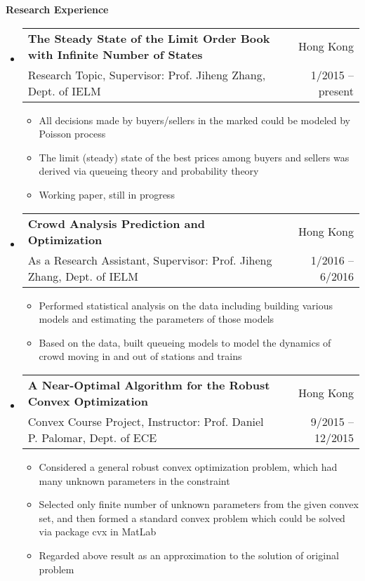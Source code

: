 \documentclass[letterpaper,10pt]{article}
\makeatletter
\newcommand{\resitem}[1]{\item #1 \vspace{-2pt}}
\newcommand{\resheading}[1]{{\large \colorbox{mygrey}{\begin{minipage}{\textwidth}{\textbf{#1 \vphantom{p\^{E}}}}\end{minipage}}}}
\newcommand{\ressubheading}[4]{
\begin{tabular*}{6.5in}{l@{\extracolsep{\fill}}r}
    \textbf{#1} & #2 \\
    #3 & #4 \\
\end{tabular*}\vspace{-6pt}}
\makeatother
\begin{document}
\resheading{Research Experience}
\begin{itemize}
\item
\ressubheading{The Steady State of the Limit Order Book with Infinite Number of States}{Hong Kong}{Research Topic, Supervisor: Prof. Jiheng Zhang, Dept. of IELM}{1/2015 -- present}
\begin{itemize}
\resitem{All decisions made by buyers/sellers in the marked could be modeled by Poisson process}
\resitem{The limit (steady) state of the best prices among buyers and sellers was derived via queueing theory and probability theory}
\resitem{Working paper, still in progress}
\end{itemize}



\item
\ressubheading{Crowd Analysis Prediction and Optimization}{Hong Kong}{As a Research Assistant, Supervisor: Prof. Jiheng Zhang, Dept. of IELM}{1/2016 -- 6/2016}
\begin{itemize}
\resitem{Performed statistical analysis on the data including building various models and estimating the parameters of those models}
\resitem{Based on the data, built queueing models to model the dynamics of crowd moving in and out of stations and trains}
\end{itemize}




\item 
\ressubheading{A Near-Optimal Algorithm for the Robust Convex Optimization}{Hong Kong}{Convex Course Project, Instructor: Prof. Daniel P. Palomar, Dept. of ECE}{9/2015 -- 12/2015}
\begin{itemize}
\resitem{Considered a general robust convex optimization problem, which had many unknown parameters in the constraint}
\resitem{Selected only finite number of unknown parameters from the given convex set, and then formed a standard convex problem which could be solved via package cvx in MatLab}
\resitem{Regarded above result as an approximation to the solution of original problem}
\end{itemize}



\end{itemize}
\end{document}

